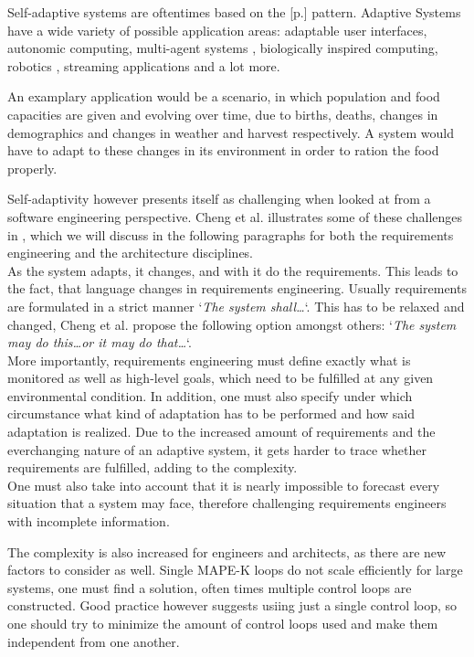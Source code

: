     \quad Self-adaptive systems are oftentimes based on the  [p.\pageref{sub:mape}] pattern.
    Adaptive Systems have a wide variety of possible application areas: adaptable user interfaces, autonomic computing, multi-agent systems \cite{Cheng:2009:SES:1573856.1573858}, 
    biologically inspired computing, robotics \cite{10.1007/978-3-319-59480-4_44}, streaming applications and a lot more.

    \quad An examplary application would be a scenario, in which population and food capacities are given and evolving over time, due to births, deaths, changes in demographics 
    and changes in weather and harvest respectively. A system would have to adapt to these changes in its environment in order to ration the food properly.

    \quad Self-adaptivity however presents itself as challenging when looked at from a software engineering perspective.
    Cheng et al. illustrates some of these challenges in \cite{Cheng:2009:SES:1573856.1573858}, which we will discuss in the following paragraphs for both the 
    requirements engineering and the architecture disciplines.
    \\
    As the system adapts, it changes, and with it do the requirements. This leads to the fact, that language changes in requirements engineering.
    Usually requirements are formulated in a strict manner `\textit{The system shall\ldots}`. This has to be relaxed and changed, Cheng et al. propose the following 
    option amongst others: `\textit{The system may do this\ldots or it may do that\ldots}`.
    \\
    More importantly, requirements engineering must define exactly what is monitored as well as high-level goals, which need to be fulfilled at any given environmental condition.
    In addition, one must also specify under which circumstance what kind of adaptation has to be performed and how said adaptation is realized.
    Due to the increased amount of requirements and the everchanging nature of an adaptive system, it gets harder to trace whether requirements are fulfilled, adding to the complexity.
    \\
    One must also take into account that it is nearly impossible to forecast every situation that a system may face, therefore challenging requirements engineers with incomplete information.

    \quad The complexity is also increased for engineers and architects, as there are new factors to consider as well.
    Single MAPE-K loops do not scale efficiently for large systems, one must find a solution, often times multiple control loops are constructed.
    Good practice however suggests usiing just a single control loop\cite{accidents}, so one should try to minimize the amount of control loops used and
    make them independent from one another.
    
